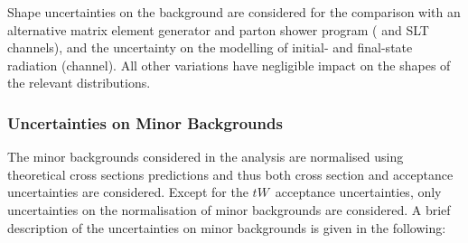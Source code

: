 Shape uncertainties on the \ttbar background are considered for the comparison
with an alternative matrix element generator and parton shower program (\hadhad
and \lephad SLT channels), and the uncertainty on the modelling of initial- and
final-state radiation (\hadhad channel). All other variations have negligible
impact on the shapes of the relevant distributions.


\subsubsection{Uncertainties on Minor Backgrounds}

The minor backgrounds considered in the analysis are normalised using
theoretical cross sections predictions and thus both cross section and
acceptance uncertainties are considered. Except for the $tW$~acceptance
uncertainties, only uncertainties on the normalisation of minor backgrounds are
considered. A brief description of the uncertainties on minor backgrounds is
given in the following:
